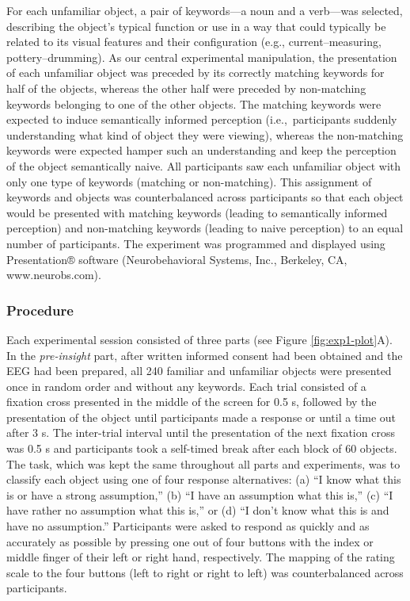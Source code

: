 \documentclass[
  english,
  man,12pt,twoside]{apa7}
\begin{document}
For each unfamiliar object, a pair of keywords---a noun and a verb---was selected, describing the object's typical function or use in a way that could typically be related to its visual features and their configuration (e.g., current--measuring, pottery--drumming). As our central experimental manipulation, the presentation of each unfamiliar object was preceded by its correctly matching keywords for half of the objects, whereas the other half were preceded by non-matching keywords belonging to one of the other objects. The matching keywords were expected to induce semantically informed perception (i.e.,~participants suddenly understanding what kind of object they were viewing), whereas the non-matching keywords were expected hamper such an understanding and keep the perception of the object semantically naive. All participants saw each unfamiliar object with only one type of keywords (matching or non-matching). This assignment of keywords and objects was counterbalanced across participants so that each object would be presented with matching keywords (leading to semantically informed perception) and non-matching keywords (leading to naive perception) to an equal number of participants. The experiment was programmed and displayed using Presentation® software (Neurobehavioral Systems, Inc., Berkeley, CA, www.neurobs.com).

\hypertarget{procedure}{%
\subsubsection{Procedure}\label{procedure}}

Each experimental session consisted of three parts (see Figure \ref{fig:exp1-plot}A). In the \emph{pre-insight} part, after written informed consent had been obtained and the EEG had been prepared, all 240 familiar and unfamiliar objects were presented once in random order and without any keywords. Each trial consisted of a fixation cross presented in the middle of the screen for 0.5 s, followed by the presentation of the object until participants made a response or until a time out after 3 s. The inter-trial interval until the presentation of the next fixation cross was 0.5 s and participants took a self-timed break after each block of 60 objects. The task, which was kept the same throughout all parts and experiments, was to classify each object using one of four response alternatives: (a) ``I know what this is or have a strong assumption,'' (b) ``I have an assumption what this is,'' (c) ``I have rather no assumption what this is,'' or (d) ``I don't know what this is and have no assumption.'' Participants were asked to respond as quickly and as accurately as possible by pressing one out of four buttons with the index or middle finger of their left or right hand, respectively. The mapping of the rating scale to the four buttons (left to right or right to left) was counterbalanced across participants.
\end{document}
